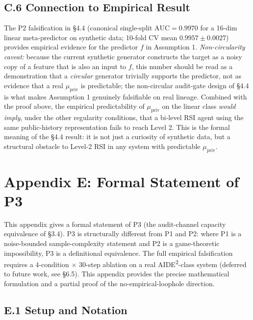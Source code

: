 \documentclass{article}
\theoremstyle{definition}
\begin{document}
\subsection*{C.6 Connection to Empirical Result}

The P2 falsification in \S4.4 (canonical single-split $\text{AUC} = 0.9970$ for a 16-dim linear meta-predictor on synthetic data; 10-fold CV mean $0.9957\pm0.0027$) provides empirical evidence for the predictor $f$ in Assumption 1. \emph{Non-circularity caveat:} because the current synthetic generator constructs the target as a noisy copy of a feature that is also an input to $f$, this number should be read as a demonstration that a \emph{circular} generator trivially supports the predictor, not as evidence that a real $\mu_{\text{priv}}$ is predictable; the non-circular audit-gate design of \S4.4 is what makes Assumption 1 genuinely falsifiable on real lineage. Combined with the proof above, the empirical predictability of $\mu_{\text{priv}}$ on the linear class \emph{would imply}, under the other regularity conditions, that a bi-level RSI agent using the same public-history representation fails to reach Level 2. This is the formal meaning of the \S4.4 result: it is not just a curiosity of synthetic data, but a structural obstacle to Level-2 RSI in any system with predictable $\mu_{\text{priv}}$.



\section*{Appendix E: Formal Statement of P3}

This appendix gives a formal statement of P3 (the audit-channel capacity equivalence of \S3.4). P3 is structurally different from P1 and P2: where P1 is a noise-bounded sample-complexity statement and P2 is a game-theoretic impossibility, P3 is a definitional equivalence. The full empirical falsification requires a 4-condition $\times$ 30-step ablation on a real AIDE\textsuperscript{2}-class system (deferred to future work, see \S6.5). This appendix provides the precise mathematical formulation and a partial proof of the no-empirical-loophole direction.

\subsection*{E.1 Setup and Notation}
\end{document}
